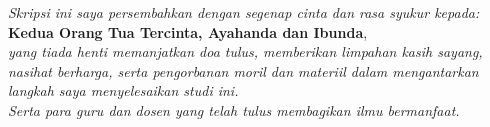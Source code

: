 
\newpage
\thispagestyle{empty}

\vspace*{6cm}

\begin{flushright}
\textit{Skripsi ini saya persembahkan dengan segenap cinta dan rasa syukur kepada:}\\
\vspace{0.5cm}
\textbf{Kedua Orang Tua Tercinta, Ayahanda dan Ibunda},\\
\textit{yang tiada henti memanjatkan doa tulus, memberikan limpahan kasih sayang,}\\
\textit{nasihat berharga, serta pengorbanan moril dan materiil dalam mengantarkan}\\
\textit{langkah saya menyelesaikan studi ini.}\\
\vspace{0.5cm}
\textit{Serta para guru dan dosen yang telah tulus membagikan ilmu bermanfaat.}
\end{flushright}
